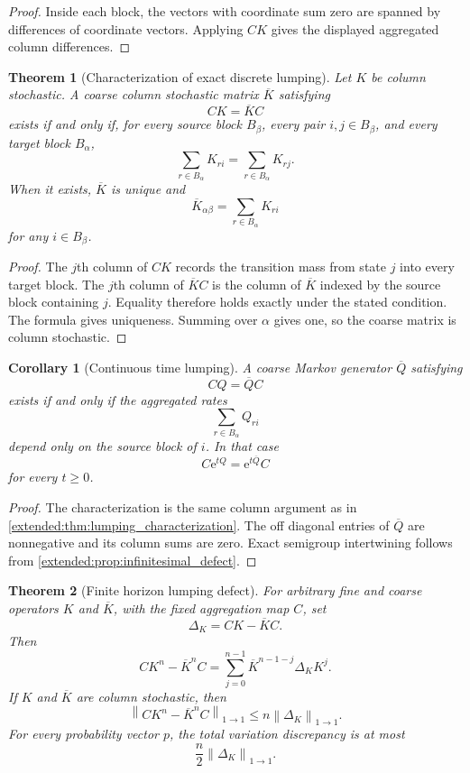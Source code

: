 \documentclass[11pt,letterpaper]{article}
\newtheorem{theorem}{Theorem}[section]
\theoremstyle{plain}
\theoremstyle{plain}
\theoremstyle{plain}
\newtheorem{corollary}[corollary]{Corollary}
\theoremstyle{definition}
\theoremstyle{definition}
\theoremstyle{definition}
\theoremstyle{definition}
\theoremstyle{definition}
\theoremstyle{remark}
\theoremstyle{remark}
\theoremstyle{remark}
\theoremstyle{remark}
\theoremstyle{remark}
\newcommand{\norm}[1]{\left\lVert#1\right\rVert}
\theoremstyle{remark}
\newcommand{\e}{\mathrm e}
\let\KomorebiPrimitivemathrm\mathrm
\renewcommand{\mathrm}[1]{{\KomorebiPrimitivemathrm{#1}}}
\begin{document}
\begin{proof}
Inside each block, the vectors with coordinate sum zero are spanned by differences of coordinate vectors. Applying \(CK\) gives the displayed aggregated column differences.
\end{proof}

\begin{theorem}[Characterization of exact discrete lumping]\label{extended:record:032}\label{extended:thm:lumping_characterization}
Let \(K\) be column stochastic. A coarse column stochastic matrix \(\overline K\) satisfying
\[
CK=\overline KC
\]
exists if and only if, for every source block \(B_\beta\), every pair \(i,j\in B_\beta\), and every target block \(B_\alpha\),
\[
\sum_{r\in B_\alpha}K_{ri}
=
\sum_{r\in B_\alpha}K_{rj}.
\]
When it exists, \(\overline K\) is unique and
\[
\overline K_{\alpha\beta}
=
\sum_{r\in B_\alpha}K_{ri}
\]
for any \(i\in B_\beta\).
\end{theorem}

\begin{proof}
The \(j\)th column of \(CK\) records the transition mass from state \(j\) into every target block. The \(j\)th column of \(\overline KC\) is the column of \(\overline K\) indexed by the source block containing \(j\). Equality therefore holds exactly under the stated condition. The formula gives uniqueness. Summing over \(\alpha\) gives one, so the coarse matrix is column stochastic.
\end{proof}

\begin{corollary}[Continuous time lumping]\label{extended:record:033}\label{extended:cor:continuous_lumping}
A coarse Markov generator \(\overline Q\) satisfying
\[
CQ=\overline QC
\]
exists if and only if the aggregated rates
\[
\sum_{r\in B_\alpha}Q_{ri}
\]
depend only on the source block of \(i\). In that case
\[
C\e^{tQ}=\e^{t\overline Q}C
\]
for every \(t\geq0\).
\end{corollary}

\begin{proof}
The characterization is the same column argument as in \cref{extended:thm:lumping_characterization}. The off diagonal entries of \(\overline Q\) are nonnegative and its column sums are zero. Exact semigroup intertwining follows from \cref{extended:prop:infinitesimal_defect}.
\end{proof}

\begin{theorem}[Finite horizon lumping defect]\label{extended:record:034}\label{extended:thm:finite_horizon_lumping}
For arbitrary fine and coarse operators \(K\) and \(\overline K\), with the fixed aggregation map \(C\), set
\[
\Delta_K=CK-\overline KC.
\]
Then
\[
CK^n-\overline K^nC
=
\sum_{j=0}^{n-1}
\overline K^{n-1-j}\Delta_KK^j.
\]
If \(K\) and \(\overline K\) are column stochastic, then
\[
\norm{CK^n-\overline K^nC}_{1\to1}
\leq
n\norm{\Delta_K}_{1\to1}.
\]
For every probability vector \(p\), the total variation discrepancy is at most
\[
\frac n2\norm{\Delta_K}_{1\to1}.
\]
\end{theorem}
\end{document}
